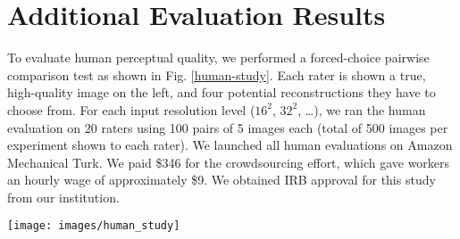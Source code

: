 \documentclass{article}
\newcommand{\w}{2.5cm}
\begin{document}
\FloatBarrier

\section{Additional Evaluation Results}
\label{supp-eval-humans}


To evaluate human perceptual quality, we performed a forced-choice pairwise comparison test as shown in Fig. \ref{human-study}. Each rater is shown a true, high-quality image on the left, and four potential reconstructions they have to choose from.  For each input resolution level ($16^2$, $32^2$, \dots), we ran the human evaluation on 20 raters using 100 pairs of 5 images each (total of 500 images per experiment shown to each rater). We launched all human evaluations on Amazon Mechanical Turk. We paid \$346 for the crowdsourcing effort, which gave workers an hourly wage of approximately \$9. We obtained IRB approval for this study from our institution.


\begin{figure*}
\begin{center}
\texttt{[image: images/human\_study]}
\caption{Setup of our human study, using a forced-choice pairwise comparison design. Each rater is shown a true, high-quality image on the left, and four potential reconstructions (A-D) by different algorithms. They have to select which reconstruction best resembled the HQ image. }
\label{human-study}
\end{center}
\end{figure*}







\renewcommand{\w}{1.8cm}



\renewcommand{\is}{52116}
\renewcommand{\step}{step700}
\end{document}
